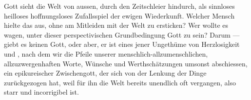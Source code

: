 Gott sieht die Welt von aussen, durch den Zeitschleier hindurch, als sinnloses heilloses hoffnungsloses Zufallsspiel der ewigen Wiederkunft. Welcher Mensch hielte das aus, ohne am Mitleiden mit der Welt zu ersticken? Wer wollte es wagen, unter dieser perspectivischen Grundbedingung Gott zu sein? Darum — giebt es keinen Gott, oder aber, er ist eines jener Ungethüme von Herzlosigkeit und , nach dem wir die Pfeile unserer menschlich-allzumenschlichen, allzuzwergenhaften Worte, Wünsche und Werthschätzungen umsonst abschiessen, ein epikureischer Zwischengott, der sich von der Lenkung der Dinge zurückgezogen hat, weil für ihn die Welt bereits unendlich oft vergangen, also starr und incorrigibel ist.
\par

